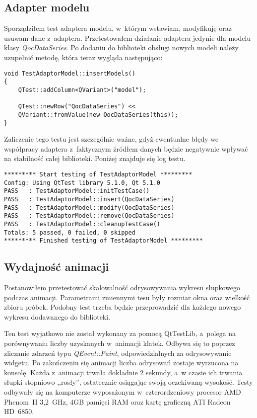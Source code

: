 \subsection{Adapter modelu}
Sporządziłem test adaptera modelu, w~którym wstawiam, modyfikuję oraz usuwam dane z~adaptera. Przetestowałem działanie adaptera jedynie dla modelu klasy \textit{QocDataSeries}. Po dodaniu do biblioteki obsługi nowych modeli należy uzupełnić metodę, która teraz wygląda następująco:

\begin{lstlisting}
void TestAdaptorModel::insertModels()
{
	QTest::addColumn<QVariant>("model");

	QTest::newRow("QocDataSeries") << 
	QVariant::fromValue(new QocDataSeries(this));
}
\end{lstlisting}

Zaliczenie tego testu jest szczególnie ważne, gdyż ewentualne błędy we współpracy adaptera z~faktycznym źródłem danych będzie negatywnie wpływać na stabilność całej biblioteki. Poniżej znajduje się log testu.

\begin{lstlisting}
********* Start testing of TestAdaptorModel *********
Config: Using QtTest library 5.1.0, Qt 5.1.0
PASS   : TestAdaptorModel::initTestCase()
PASS   : TestAdaptorModel::insert(QocDataSeries)
PASS   : TestAdaptorModel::modify(QocDataSeries)
PASS   : TestAdaptorModel::remove(QocDataSeries)
PASS   : TestAdaptorModel::cleanupTestCase()
Totals: 5 passed, 0 failed, 0 skipped
********* Finished testing of TestAdaptorModel *********
\end{lstlisting}

\subsection{Wydajność animacji}
Postanowiłem przetestować skalowalność odrysowywania wykresu słupkowego podczas animacji. Parametrami zmiennymi tesu były rozmiar okna oraz wielkość zbioru próbek. Podobny test trzeba będzie przeprowadzić dla każdego nowego wykresu dodawanego do biblioteki.

Ten test wyjatkowo nie został wykonany za pomocą QtTestLib, a~polega na porównywaniu liczby uzyskanych w~animacji klatek. Odbywa się to poprzez zliczanie zdarzeń typu \textit{QEvent::Paint}, odpowiedzialnych za odrysowywanie widgetu. Po zakończeniu się animacji liczba odrysowań zostaje wyrzucona na konsolę. Każda z~animacji trwała dokładnie 2 sekundy, a~w czasie ich trwania słupki stopniowo ,,rosły'', ostatecznie osiągając swoją oczekiwaną wysokość. Testy odbywały się na komputerze wyposażonym w~czterordzeniowy procesor AMD Phenom~II 3,2~GHz, 4GB pamięci RAM oraz kartę graficzną ATI Radeon HD~6850.

